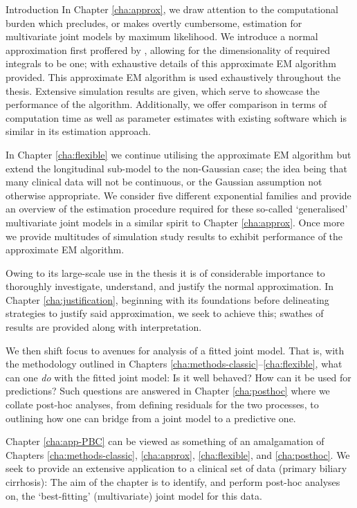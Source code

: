 \begin{chapter}{\label{cha:intro}Introduction}
  In Chapter \ref{cha:approx}, we draw attention to the computational burden which precludes, or makes overtly cumbersome, estimation for multivariate joint models by maximum likelihood. We introduce a normal approximation first proffered by \citet{Bernhardt15}, allowing for the dimensionality of required integrals to be one; with exhaustive details of this approximate EM algorithm provided. This approximate EM algorithm is used exhaustively throughout the thesis. Extensive simulation results are given, which serve to showcase the performance of the algorithm. Additionally, we offer comparison in terms of computation time as well as parameter estimates with existing software which is similar in its estimation approach.

  In Chapter \ref{cha:flexible} we continue utilising the approximate EM algorithm but extend the longitudinal sub-model to the non-Gaussian case; the idea being that many clinical data will not be continuous, or the Gaussian assumption not otherwise appropriate. We consider five different exponential families and provide an overview of the estimation procedure required for these so-called `generalised' multivariate joint models in a similar spirit to Chapter \ref{cha:approx}. Once more we provide multitudes of simulation study results to exhibit performance of the approximate EM algorithm.

  Owing to its large-scale use in the thesis it is of considerable importance to thoroughly investigate, understand, and justify the normal approximation. In Chapter \ref{cha:justification}, beginning with its foundations before delineating strategies to justify said approximation, we seek to achieve this; swathes of results are provided along with interpretation.

  We then shift focus to avenues for analysis of a fitted joint model. That is, with the methodology outlined in Chapters \ref{cha:methods-classic}--\ref{cha:flexible}, what can one \textit{do} with the fitted joint model: Is it well behaved? How can it be used for predictions? Such questions are answered in Chapter \ref{cha:posthoc} where we collate post-hoc analyses, from defining residuals for the two processes, to outlining how one can bridge from a joint model to a predictive one.

  Chapter \ref{cha:app-PBC} can be viewed as something of an amalgamation of Chapters \ref{cha:methods-classic}, \ref{cha:approx}, \ref{cha:flexible}, and \ref{cha:posthoc}. We seek to provide an extensive application to a clinical set of data (primary biliary cirrhosis): The aim of the chapter is to identify, and perform post-hoc analyses on, the `best-fitting' (multivariate) joint model for this data.  


\end{chapter}
